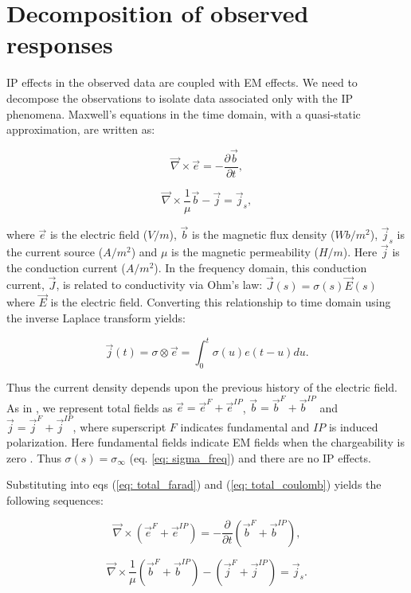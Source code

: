 \documentclass[extra,mreferee]{gji}
\newcommand{\curl}{{\vec \nabla}\times}
\newcommand {\J}{{\vec J}}
\newcommand {\E}{{\vec E}}
\newcommand{\siginf}{\sigma_\infty}
\renewcommand {\j}  { {\vec j} }
\renewcommand {\b}  { {\vec b} }
\newcommand {\e}  { {\vec e} }
\begin{document}
\section{Decomposition of observed responses}
IP effects in the observed data are coupled with EM effects. We need to decompose the observations to isolate data associated only with the IP phenomena.  
Maxwell's equations in the time domain, with a quasi-static approximation, are written as:
\begin{linenomath*}
\begin{equation}
  \curl{\e} = -\frac{\partial \b}{\partial t},
  \label{eq: total_farad}
\end{equation}
\end{linenomath*}
\begin{linenomath*}
\begin{equation}
  \curl{\frac{1}{\mu}\b} - \j= \j_{s},
  \label{eq: total_coulomb}
\end{equation}
\end{linenomath*}
where $\e$ is the electric field ($V/m$), $\b$ is the magnetic flux density ($Wb/m^2$), $\j_{s}$ is the current source ($A/m^2$) and $\mu$ is the magnetic permeability ($H/m$). Here $\j$ is the conduction current ($A/m^2$). In the frequency domain, this conduction current, $\J$, is related to conductivity via Ohm’s law: $\J(s) = \sigma(s)\E(s)$ where $\E$ is the electric field. 
Converting this relationship to time domain using the inverse Laplace transform yields:
\begin{linenomath*}
\begin{equation}
  \j(t) = \sigma \otimes \e = \int_0^t \sigma(u) e(t-u) du.
  \label{eq: ohms_law_convolution}
\end{equation}
\end{linenomath*}
Thus the current density depends upon the previous history of the electric field.
As in \cite{Smith1988a}, we represent total fields as $\e = \e^{F} + \e^{IP}$, $\b = \b^{F} + \b^{IP}$ and $\j = \j^{F} + \j^{IP}$, where superscript $F$ indicates fundamental and $IP$ is induced polarization. 
Here fundamental fields indicate EM fields when the chargeability is zero . Thus  $\sigma(s) = \siginf$  (eq. \ref{eq: sigma_freq}) and there are no IP effects.

Substituting into eqs (\ref{eq: total_farad}) and (\ref{eq: total_coulomb}) yields the following sequences:
\begin{linenomath*}
\begin{equation}
  \curl({\e^{F}+\e^{IP}}) = -\frac{\partial}{\partial t} (\b^{F}+\b^{IP}),
\end{equation}
\end{linenomath*}
\begin{linenomath*}
\begin{equation}
  \curl\frac{1}{\mu}(\b^{F}+\b^{IP}) - (\j^{F}+\j^{IP})= \j_{s}.
\end{equation}
\end{linenomath*}
\end{document}
